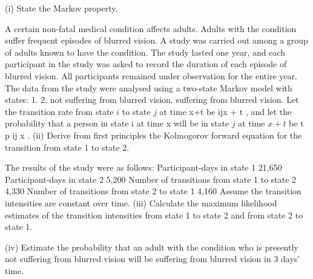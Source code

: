 \documentclass[a4paper,12pt]{article}
\begin{document}
\begin{enumerate}

(i) State the Markov property.


A certain non-fatal medical condition affects adults. Adults with the condition suffer frequent episodes of blurred vision. A study was carried out among a group of adults known to have the condition. The study lasted one year, and each participant in the
study was asked to record the duration of each episode of blurred vision. All participants remained under observation for the entire year.
The data from the study were analysed using a two-state Markov model with states:
1.
2.
not suffering from blurred vision.
suffering from blurred vision.
Let the transition rate from state $i$ to state $j$ at time x+t be \mu ijx + t , and let the probability
that a person in state i at time x will be in state $j$ at time $x+t$ be t p ij x .
(ii)
Derive from first principles the Kolmogorov forward equation for the
transition from state 1 to state 2.

The results of the study were as follows:
Participant-days in state 1
21,650
Participant-days in state 2
5,200
Number of transitions from state 1 to state 2 4,330
Number of transitions from state 2 to state 1 4,160
Assume the transition intensities are constant over time.
(iii) Calculate the maximum likelihood estimates of the transition intensities from
state 1 to state 2 and from state 2 to state 1.

(iv) Estimate the probability that an adult with the condition who is presently not
suffering from blurred vision will be suffering from blurred vision in 3 days’
time.



\end{enumerate}
\end{document}

